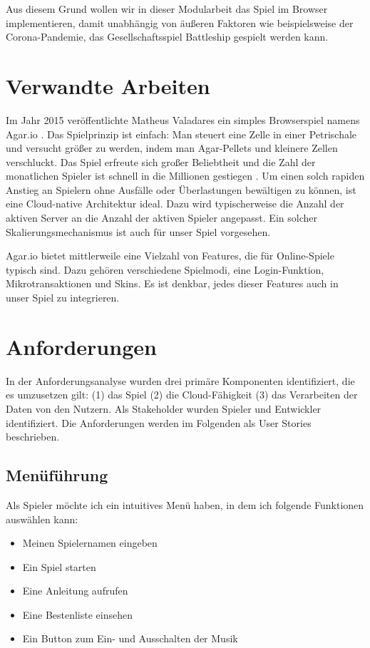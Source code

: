 \documentclass[a4paper, 10pt, conference]{IEEEtran}
\begin{document}
Aus diesem Grund wollen wir in dieser Modularbeit das Spiel im Browser implementieren, damit unabhängig von äußeren Faktoren wie beispielsweise der Corona-Pandemie, das Gesellschaftsspiel Battleship gespielt werden kann. 

\section{Verwandte Arbeiten}\label{sec:verwandte_arbeiten}

Im Jahr 2015 veröffentlichte Matheus Valadares ein simples Browserspiel namens Agar.io \cite{agario}. Das Spielprinzip ist einfach: Man steuert eine Zelle in einer Petrischale und versucht größer zu werden, indem man Agar-Pellets und kleinere Zellen verschluckt. Das Spiel erfreute sich großer Beliebtheit und die Zahl der monatlichen Spieler ist schnell in die Millionen gestiegen \cite{takahashi2017}. Um einen solch rapiden Anstieg an Spielern ohne Ausfälle oder Überlastungen bewältigen zu können, ist eine Cloud-native Architektur ideal. Dazu wird typischerweise die Anzahl der aktiven Server an die Anzahl der aktiven Spieler angepasst. Ein solcher Skalierungsmechanismus ist auch für unser Spiel vorgesehen.

Agar.io bietet mittlerweile eine Vielzahl von Features, die für Online-Spiele typisch sind. Dazu gehören verschiedene Spielmodi, eine Login-Funktion, Mikrotransaktionen und Skins. Es ist denkbar, jedes dieser Features auch in unser Spiel zu integrieren.

\section{Anforderungen}\label{sec:anforderungen}
In der Anforderungsanalyse wurden drei primäre Komponenten identifiziert, die es umzusetzen gilt: (1) das Spiel (2) die Cloud-Fähigkeit (3) das Verarbeiten der Daten von den Nutzern. Als Stakeholder wurden Spieler und Entwickler identifiziert. Die Anforderungen werden im Folgenden als User Stories beschrieben.


\subsection{Menüführung}
Als Spieler möchte ich ein intuitives Menü haben, in dem ich folgende Funktionen auswählen kann:
\begin{itemize}
	\item Meinen Spielernamen eingeben
	\item Ein Spiel starten
	\item Eine Anleitung aufrufen
	\item Eine Bestenliste einsehen
	\item Ein Button zum Ein- und Ausschalten der Musik
\end{itemize}
\end{document}
